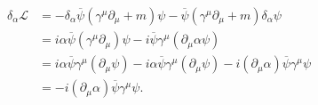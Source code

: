 \[
    \begin{aligned}
        \delta_{\alpha} \mathcal{L} & = - \delta_{\alpha} \overline{\psi} (\gamma^{\mu} \partial_\mu + m) \psi - \overline{\psi} (\gamma^{\mu} \partial_\mu + m) \delta_{\alpha} \psi                                     \\
                                    & = i \alpha \overline{\psi} (\gamma^{\mu} \partial_\mu) \psi - i \overline{\psi} \gamma^{\mu} (\partial_\mu \alpha \psi)                                                             \\
                                    & = i \alpha \overline{\psi} \gamma^{\mu} (\partial_\mu \psi) - i \alpha \overline{\psi} \gamma^{\mu} (\partial_\mu \psi) - i (\partial_\mu \alpha) \overline{\psi} \gamma^{\mu} \psi \\
                                    & = - i (\partial_\mu \alpha) \overline{\psi} \gamma^{\mu} \psi.
    \end{aligned}
\]

